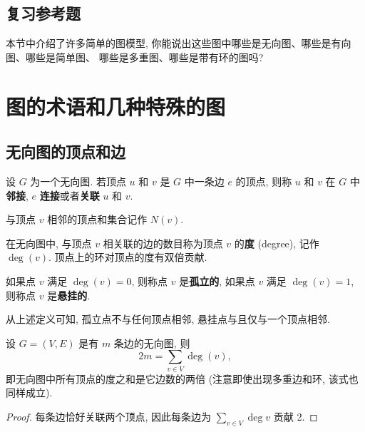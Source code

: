 \documentclass[10pt,UTF8]{book} %
\begin{document}
\subsection{复习参考题}

\begin{exercise}
    本节中介绍了许多简单的图模型, 你能说出这些图中哪些是无向图、哪些是有向图、哪些是简单图、
    哪些是多重图、哪些是带有环的图吗?
\end{exercise}

\section{图的术语和几种特殊的图}

\subsection{无向图的顶点和边}

\begin{definition}
    设 $G$ 为一个无向图. 若顶点 $u$ 和 $v$ 是 $G$ 中一条边 $e$ 的顶点, 则称 $u$ 和 $v$
    在 $G$ 中\textbf{邻接}, $e$ \textbf{连接}或者\textbf{关联} $u$ 和 $v$.
\end{definition}

\begin{definition}
    与顶点 $v$ 相邻的顶点和集合记作 $N(v)$.
\end{definition}

\begin{definition}
    在无向图中, 与顶点 $v$ 相关联的边的数目称为顶点 $v$ 的\textbf{度} (degree),
    记作 $\deg(v)$. 顶点上的环对顶点的度有双倍贡献.
\end{definition}

\begin{definition}
    如果点 $v$ 满足 $\deg(v) = 0$, 则称点 $v$ 是\textbf{孤立的},
    如果点 $v$ 满足 $\deg(v) = 1$, 则称点 $v$ 是\textbf{悬挂的}.
\end{definition}

从上述定义可知, 孤立点不与任何顶点相邻, 悬挂点与且仅与一个顶点相邻.

\begin{thm}[握手定理]
    设 $G = (V, E)$ 是有 $m$ 条边的无向图, 则
    \[ 2m = \sum_{v \in V}\deg(v), \]
    即无向图中所有顶点的度之和是它边数的两倍 (注意即使出现多重边和环, 该式也同样成立).
    \begin{proof}
        每条边恰好关联两个顶点, 因此每条边为 $\sum_{v \in V}\deg{v}$ 贡献 2.
    \end{proof} 
\end{thm}
\end{document}
